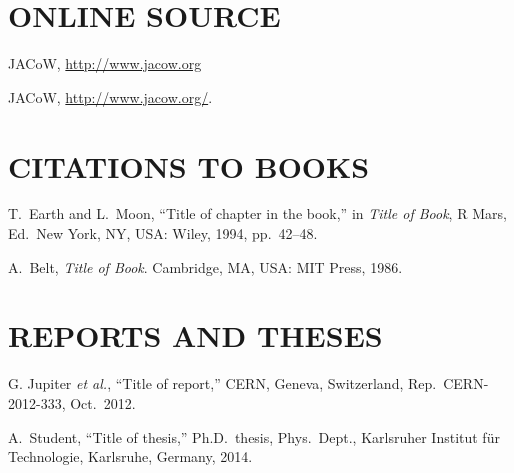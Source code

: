 \vspace*{-.5\baselineskip}
\section{ONLINE SOURCE}

\begin{thebibliography}{99} %
  \setcounter{enumi}{11}
		JACoW, \url{http://www.jacow.org} 

  \setcounter{enumi}{11}
		JACoW, \url{http://www.jacow.org/}.  

\end{thebibliography}

\section{CITATIONS TO BOOKS}

\begin{thebibliography}{99} %
	\setcounter{enumi}{12}
		T.~Earth and L.~Moon,
		“Title of chapter in the book,”
		in \emph{Title of Book}, R Mars, Ed.\ New York, NY, USA:
		Wiley, 1994, pp.\ 42--48. 
	
		A.~Belt, \emph{Title of Book}. Cambridge, MA, USA:
		MIT Press, 1986. 
\end{thebibliography}

\section{REPORTS AND THESES}

\begin{thebibliography}{99} %
	\setcounter{enumi}{14}
		G. Jupiter \emph{et al.},
		“Title of report,” CERN, Geneva, Switzerland,
		Rep.\ CERN-2012-333, Oct.\ 2012.

		A.~Student, “Title of thesis,”
		Ph.D.\ thesis, Phys.\ Dept.,
		Karlsruher Institut für Technologie, Karlsruhe,
		Germany, 2014.
\end{thebibliography}

